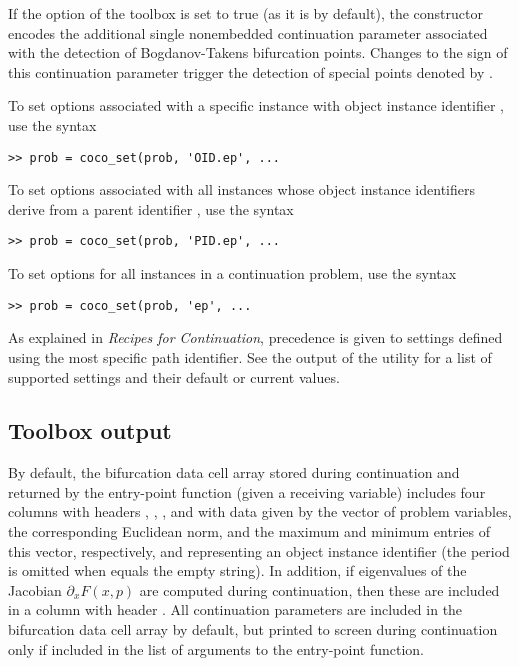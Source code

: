If the  option of the  toolbox is set to true (as it is by default), the  constructor encodes the additional single nonembedded continuation parameter  associated with the detection of Bogdanov-Takens bifurcation points. Changes to the sign of this continuation parameter trigger the detection of special points denoted by .

To set options associated with a specific  instance with object instance identifier , use the syntax
\begin{lstlisting}[language=coco-highlight]
>> prob = coco_set(prob, 'OID.ep', ...
\end{lstlisting}
To set options associated with all  instances whose object instance identifiers derive from a parent identifier , use the syntax
\begin{lstlisting}[language=coco-highlight]
>> prob = coco_set(prob, 'PID.ep', ...
\end{lstlisting}
To set options for all  instances in a continuation problem, use the syntax 
\begin{lstlisting}[language=coco-highlight]
>> prob = coco_set(prob, 'ep', ...
\end{lstlisting}
As explained in \emph{Recipes for Continuation}, precedence is given to settings defined using the most specific path identifier. See the output of the  utility for a list of supported settings and their default or current values.

\subsection{Toolbox output}
By default, the bifurcation data cell array stored during continuation and returned by the  entry-point function (given a receiving variable) includes four columns with headers , , , and  with data given by the vector of problem variables, the corresponding Euclidean norm, and the maximum and minimum entries of this vector, respectively, and  representing an object instance identifier (the period is omitted when  equals the empty string). In addition, if eigenvalues of the Jacobian $\partial_x F(x,p)$ are computed during continuation, then these are included in a column with header . All continuation parameters are included in the bifurcation data cell array by default, but printed to screen during continuation only if included in the list of arguments to the  entry-point function.


